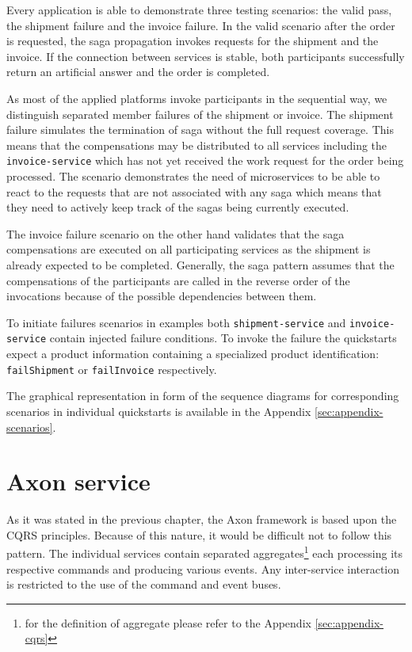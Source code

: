 \documentclass[oneside,
  digital, %
  table,   %
  lof,     %
  lot,     %
]{fithesis3}
\begin{document}
Every application is able to demonstrate three testing scenarios: the valid pass, the shipment failure and the invoice failure. In the valid scenario after the order is requested, the saga propagation invokes requests for the shipment and the invoice. If the connection between services is stable, both participants successfully return an artificial answer and the order is completed. 

As most of the applied platforms invoke participants in the sequential way, we distinguish separated member failures of the shipment or invoice. The shipment failure simulates the termination of saga without the full request coverage. This means that the compensations may be distributed to all services including the \texttt{invoice-service} which has not yet received the work request for the order being processed. The scenario demonstrates the need of microservices to be able to react to the requests that are not associated with any saga which means that they need to actively keep track of the sagas being currently executed. 

The invoice failure scenario on the other hand validates that the saga compensations are executed on all participating services as the shipment is already expected to be completed. Generally, the saga pattern assumes that the compensations of the participants are called in the reverse order of the invocations because of the possible dependencies between them.

To initiate failures scenarios in examples both \texttt{shipment-service} and \texttt{invoice-service} contain injected failure conditions. To invoke the failure the quickstarts expect a product information containing a specialized product identification: \texttt{failShipment} or \texttt{failInvoice} respectively. 

The graphical representation in form of the sequence diagrams for corresponding scenarios in individual quickstarts is available in the Appendix \ref{sec:appendix-scenarios}.

\section{Axon service}

As it was stated in the previous chapter, the Axon framework is based upon the CQRS principles. Because of this nature, it would be difficult not to follow this pattern. The individual services contain separated aggregates\footnote{for the definition of aggregate please refer to the Appendix \ref{sec:appendix-cqrs}} each processing its respective commands and producing various events. Any inter-service interaction is restricted to the use of the command and event buses.
\end{document}
